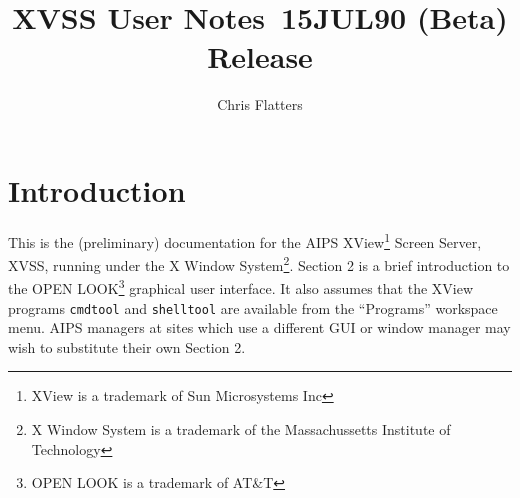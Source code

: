 
\title{XVSS User Notes\
       15JUL90 (Beta) Release}

\author{Chris Flatters}



\maketitle

\section{Introduction}

This is the (preliminary) documentation for the AIPS
XView\footnote{XView is a trademark of Sun Microsystems Inc} Screen
Server, XVSS, running under the X Window System\footnote{X Window
System is a trademark of the Massachussetts Institute of Technology}.
Section 2 is a brief introduction to the OPEN LOOK\footnote{OPEN
LOOK is a trademark of AT\&T} graphical user interface. It also
assumes that the XView programs {\tt cmdtool} and {\tt shelltool} are
available from the ``Programs'' workspace menu. AIPS managers
at sites which use a different GUI or window manager may wish to
substitute their own Section 2.

